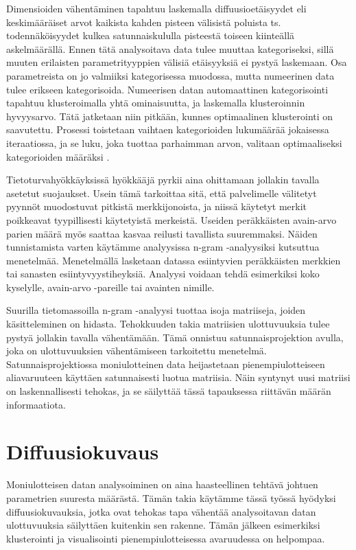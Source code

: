 Dimensioiden vähentäminen tapahtuu laskemalla diffuusioetäisyydet eli keskimääräiset arvot kaikista kahden pisteen välisistä poluista ts. todennäköisyydet kulkea satunnaiskululla pisteestä toiseen kiinteällä
askelmäärällä. Ennen tätä analysoitava data tulee muuttaa kategoriseksi, sillä muuten erilaisten parametrityyppien välisiä etäisyyksiä ei pystyä laskemaan. Osa parametreista on jo valmiiksi kategorisessa 
muodossa, mutta numeerinen data tulee erikseen kategorisoida. Numeerisen datan automaattinen kategorisointi tapahtuu klusteroimalla yhtä ominaisuutta, ja laskemalla klusteroinnin hyvyysarvo. Tätä jatketaan niin pitkään,
kunnes optimaalinen klusterointi on saavutettu. Prosessi toistetaan vaihtaen kategorioiden lukumäärää jokaisessa iteraatiossa, ja se luku, joka tuottaa parhaimman arvon, valitaan optimaaliseksi kategorioiden 
määräksi .

Tietoturvahyökkäyksissä hyökkääjä pyrkii aina ohittamaan jollakin tavalla asetetut suojaukset. Usein tämä tarkoittaa sitä, että palvelimelle välitetyt pyynnöt muodostuvat pitkistä merkkijonoista, ja niissä käytetyt
merkit poikkeavat tyypillisesti käytetyistä merkeistä. Useiden peräkkäisten avain-arvo parien määrä myös saattaa kasvaa reilusti tavallista suuremmaksi. Näiden tunnistamista varten käytämme analyysissa n-gram -analyysiksi
kutsuttua menetelmää. Menetelmällä lasketaan datassa esiintyvien peräkkäisten merkkien tai sanasten esiintyvyystiheyksiä. Analyysi voidaan tehdä esimerkiksi koko kyselylle, avain-arvo -pareille tai avainten nimille. 

Suurilla tietomassoilla n-gram -analyysi tuottaa isoja matriiseja, joiden käsitteleminen on hidasta. Tehokkuuden takia matriisien ulottuvuuksia tulee pystyä jollakin tavalla vähentämään. Tämä onnistuu satunnaisprojektion 
avulla, joka on ulottuvuuksien vähentämiseen tarkoitettu menetelmä. Satunnaisprojektiossa moniulotteinen data heijastetaan pienempiulotteiseen aliavaruuteen käyttäen satunnaisesti luotua matriisia. Näin syntynyt uusi 
matriisi on laskennallisesti tehokas, ja se säilyttää tässä tapauksessa riittävän määrän informaatiota. 

\section{Diffuusiokuvaus}

Moniulotteisen datan analysoiminen on aina haasteellinen tehtävä johtuen parametrien suuresta määrästä. Tämän takia käytämme tässä työssä hyödyksi diffuusiokuvauksia, jotka ovat tehokas tapa vähentää analysoitavan datan
ulottuvuuksia säilyttäen kuitenkin sen rakenne. Tämän jälkeen esimerkiksi klusterointi ja visualisointi pienempiulotteisessa avaruudessa on helpompaa.

